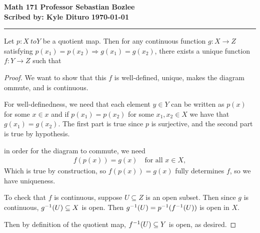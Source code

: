 \documentclass[12pt, twosided]{article}
\begin{document}
\noindent \textbf{Math 171} \hfill \textbf{Professor Sebastian Bozlee} \\
\textbf{Scribed by: Kyle Dituro} \hfill \textbf{\today}\hrule
\vspace{.2in}

\begin{thm}
  Let \(p: X\ to Y\) be a quotient map. Then for any continuous function \(g: X \to Z\) satisfying \(p(x_1) = p(x_2) \Rightarrow g(x_1) = g(x_2)\), there exists a unique function \(f: Y \to Z\) such that
  \begin{center}
  \end{center}
\end{thm}

\begin{proof}
  We want to show that this \(f\) is well-defined, unique, makes the diagram ommute, and is continuous.

  For well-definedness, we need that each element \(y \in Y\) can be written as \(p(x)\) for some \(x \in x\) and if \(p(x_1) = p(x_2)\) for some \(x_1, x_2 \in X\) we have that \(g(x_1) = g(x_2)\). The first part is true since \(p\) is surjective, and the second part is true by hypothesis.

  in order for the diagram to commute, we need
  \begin{align*}
    f(p(x)) = g(x) \quad \text{for all } x\in X,
  \end{align*}
  Which is true by construction, so \(f(p(x)) = g(x)\) fully determines \(f\), so we have uniqueness.

  To check that \(f\) is continuous, suppose \(U \subseteq Z\) is an open subset. Then since \(g\) is continuous, \(g^{-1}(U) \subseteq X\) is open. Then \(g^{-1}(U) = p^{-1}(f^{-1}(U))\) is open in \(X\).

  Then by definition of the quotient map, \(f^{-1}(U) \subseteq Y\) is open, as desired.
\end{proof}
\end{document}
